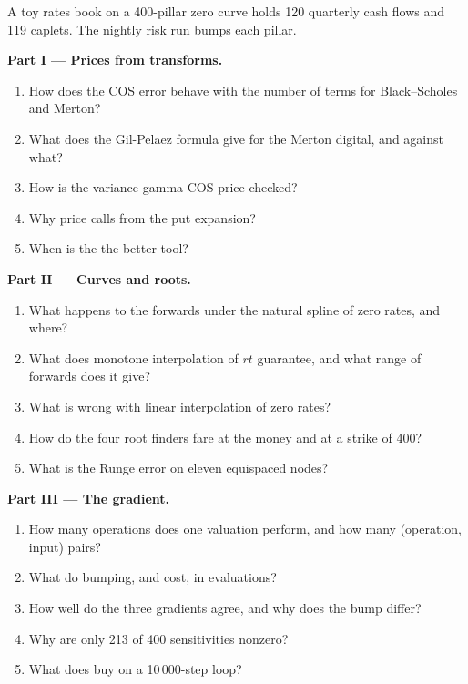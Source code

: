 \begin{problem}\label{pb:qm:transforms-interpolation-and-algorithmic-differentiation:1}
A toy rates book on a 400-pillar zero curve holds 120 quarterly cash flows and 119 caplets. The nightly risk run bumps each pillar.

\medskip\noindent\textbf{Part I --- Prices from transforms.}
\begin{enumerate}
\item How does the COS error behave with the number of terms for Black--Scholes and Merton?
\item What does the Gil-Pelaez formula give for the Merton digital, and against what?
\item How is the variance-gamma COS price checked?
\item Why price calls from the put expansion?
\item When is the  the better tool?
\end{enumerate}

\medskip\noindent\textbf{Part II --- Curves and roots.}
\begin{enumerate}[resume]
\item What happens to the forwards under the natural spline of zero rates, and where?
\item What does monotone interpolation of $rt$ guarantee, and what range of forwards does it give?
\item What is wrong with linear interpolation of zero rates?
\item How do the four root finders fare at the money and at a strike of 400?
\item What is the Runge error on eleven equispaced nodes?
\end{enumerate}

\medskip\noindent\textbf{Part III --- The gradient.}
\begin{enumerate}[resume]
\item How many operations does one valuation perform, and how many (operation, input) pairs?
\item What do bumping,  and  cost, in evaluations?
\item How well do the three gradients agree, and why does the bump differ?
\item Why are only 213 of 400 sensitivities nonzero?
\item What does  buy on a 10\,000-step loop?
\end{enumerate}


\end{problem}
